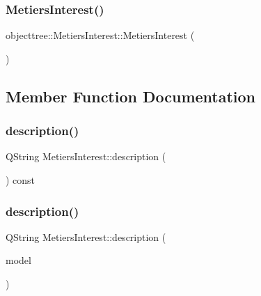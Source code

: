 \subsubsection{\texorpdfstring{MetiersInterest()}{MetiersInterest()}}
{\footnotesize\ttfamily objecttree\+::\+Metiers\+Interest\+::\+Metiers\+Interest (\begin{DoxyParamCaption}{ }\end{DoxyParamCaption})\hspace{0.3cm}{\ttfamily [inline]}}



\subsection{Member Function Documentation}
\mbox{\label{classobjecttree_1_1_metiers_interest_a4fc5e06035633bd907ce1cf472e20f08}} 
\subsubsection{\texorpdfstring{description()}{description()}\hspace{0.1cm}{\footnotesize\ttfamily [1/2]}}
{\footnotesize\ttfamily Q\+String Metiers\+Interest\+::description (\begin{DoxyParamCaption}{ }\end{DoxyParamCaption}) const}

\mbox{\label{classobjecttree_1_1_metiers_interest_a1c753589505ad86803fcedec41d3d6c7}} 
\subsubsection{\texorpdfstring{description()}{description()}\hspace{0.1cm}{\footnotesize\ttfamily [2/2]}}
{\footnotesize\ttfamily Q\+String Metiers\+Interest\+::description (\begin{DoxyParamCaption}\item[{\mbox{\hyperlink{class_object_tree_model}{Object\+Tree\+Model}} $\ast$}]{model }\end{DoxyParamCaption})}



